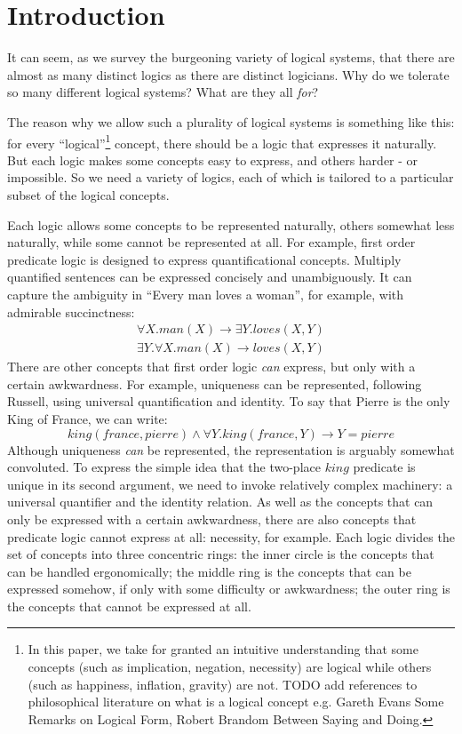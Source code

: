 \section{Introduction}\label{introduction}

It can seem, as we survey the burgeoning variety of logical systems, that there are almost as many distinct logics as there are distinct logicians.
Why do we tolerate so many different logical systems?
What are they all \emph{for}?

The reason why we allow such a plurality of logical systems is something like this: 
for every ``logical''\footnote{In this paper, we take for granted an intuitive understanding that some concepts (such as implication, negation, necessity) are logical while others (such as happiness, inflation, gravity) are not. TODO add references to philosophical literature on what is a logical concept e.g. Gareth Evans Some Remarks on Logical Form, Robert Brandom Between Saying and Doing.} concept, there should be a logic that expresses it naturally.
But each logic makes some concepts easy to express, and others harder - or impossible.
So we need a variety of logics, each of which is tailored to a particular subset of the logical concepts.

Each logic allows some concepts to be represented naturally, others somewhat less naturally, while some cannot be represented at all.
For example, first order predicate logic is designed to express quantificational concepts.
Multiply quantified sentences can be expressed concisely and unambiguously.
It can capture the ambiguity in ``Every man loves a woman'', for example, with admirable succinctness:
\begin{eqnarray}
\forall X. man(X) \rightarrow \exists Y . loves(X,Y) \nonumber \\
\exists Y. \forall X. man(X) \rightarrow loves(X,Y) \nonumber
\end{eqnarray}
There are other concepts that first order logic \emph{can} express, but only with a certain awkwardness.
For example, uniqueness can be represented, following Russell, using universal quantification and identity.
To say that Pierre is the only King of France, we can write:
\[
king(france, pierre) \land \forall Y. king(france, Y) \rightarrow Y = pierre
\]
Although uniqueness \emph{can} be represented, the representation is arguably somewhat convoluted. 
To express the simple idea that the two-place $king$ predicate is unique in its second argument, we need to invoke relatively complex machinery: a universal quantifier and the identity relation.
As well as the concepts that can only be expressed with a certain awkwardness, there are also concepts that predicate logic cannot express at all: necessity, for example.
Each logic divides the set of concepts into three concentric rings: the inner circle is the concepts that can be handled ergonomically; the middle ring is the concepts that can be expressed somehow, if only with some difficulty or awkwardness; the outer ring is the concepts that cannot be expressed at all.

